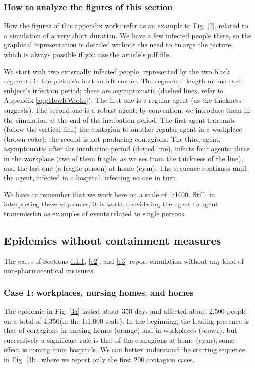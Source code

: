 \documentclass[11pt]{article}
\begin{document}
\subsubsection{How to analyze the figures of this section}
\label{howToAnalyze}

How the figures of this appendix work: refer as an example to Fig. \ref{2}, related to a simulation of a very short duration. We have a few infected people there, so the graphical representation is detailed without the need to enlarge the picture, which is always possible if you use the article's pdf file.

We start with two externally infected people, represented by the two black segments in the picture's bottom-left corner. The segments' length means each subject's infection period; these are asymptomatic (dashed lines, refer to Appendix \ref{appHowItWorks}). The first one is a regular agent (as the thickness suggests). The second one is a robust agent; by convention, we introduce them in the simulation at the end of the incubation period. The first agent transmits (follow the vertical link) the contagion to another regular agent in a workplace (brown color); the second is not producing contagions. The third agent, asymptomatic after the incubation period (dotted line), infects four agents: three in the workplace (two of them fragile, as we see from the thickness of the line), and the last one (a fragile person) at home (cyan). The sequence continues until the  agent, infected in a hospital, infecting no one in turn.

We have to remember that we work here on a scale of 1:1000. Still, in interpreting these sequences, it is worth considering the agent to agent transmission as examples of events related to single persons.

\subsection{Epidemics without containment measures}

The cases of Sections \ref{c1}, \ref{c2}, and \ref {c3} report simulation without any kind of non-pharmaceutical measures.


\subsubsection{Case 1: workplaces, nursing homes, and homes}
\label{c1}

The epidemic in Fig. \ref{3a} lasted about 350 days and affected about 2,500 people on a total of 4,350(in the 1:1,000 scale). In the beginning, the leading presence is that of contagions in nursing homes (orange) and in workplaces (brown), but successively a significant role is that of the contagions at home (cyan); some effect is coming from hospitals. We can better understand the starting sequence in Fig. \ref{3b}, where we report only the first 200 contagion cases.
  
\end{document}
